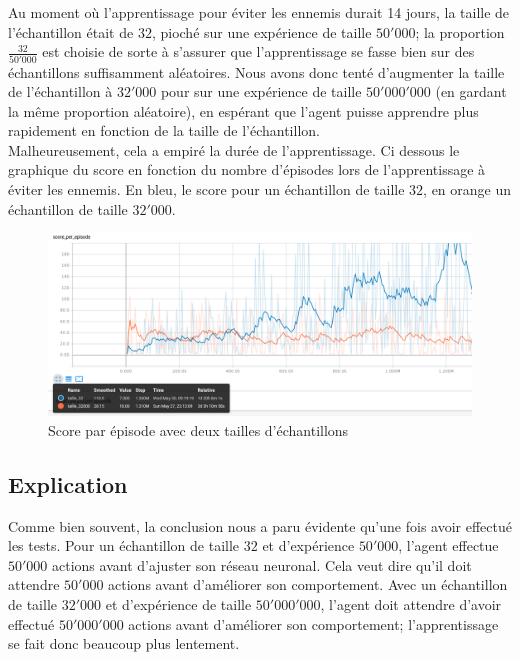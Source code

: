 \documentclass[11pt,a4paper]{report}
\begin{document}
   \par Au moment où l'apprentissage pour éviter les ennemis durait 14 jours, la taille de l'échantillon était de $32$, pioché sur une expérience de taille $50'000$; la proportion $\frac{32}{50'000}$ est choisie de sorte à s'assurer que l'apprentissage se fasse bien sur des échantillons suffisamment aléatoires. Nous avons donc tenté d'augmenter la taille de l'échantillon à $32'000$ pour sur une expérience de taille $50'000'000$ (en gardant la même proportion aléatoire), en espérant que l'agent puisse apprendre plus rapidement en fonction de la taille de l'échantillon. \\
   Malheureusement, cela a empiré la durée de l'apprentissage. Ci dessous le graphique du score en fonction du nombre d'épisodes lors de l'apprentissage à éviter les ennemis. En bleu, le score pour un échantillon de taille $32$, en orange un échantillon de taille $32'000$.
   
   \begin{figure}[!h]
   \center
   \includegraphics[scale=0.4]{ressources/batch_size.png}
   \caption{Score par épisode avec deux tailles d'échantillons}
   \end{figure} 
   
   \subsection{Explication}
   
   \par Comme bien souvent, la conclusion nous a paru évidente qu'une fois avoir effectué les tests. Pour un échantillon de taille $32$ et d’expérience $50'000$, l'agent effectue $50'000$ actions avant d'ajuster son réseau neuronal. Cela veut dire qu'il doit attendre $50'000$ actions avant d'améliorer son comportement. Avec un échantillon de taille $32'000$ et d'expérience de taille $50'000'000$, l'agent doit attendre d'avoir effectué $50'000'000$ actions avant d'améliorer son comportement; l'apprentissage se fait donc beaucoup plus lentement. 
   
\end{document}

